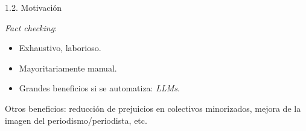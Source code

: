 \begin{frame}{1.2. Motivación}

\textit{Fact checking}:
\begin{itemize}
    \item Exhaustivo, laborioso.
    \item Mayoritariamente manual.
    \item Grandes beneficios si se automatiza: \textit{LLMs}.
\end{itemize}







\vspace{1ex}



\vspace{2ex}

Otros beneficios: reducción de prejuicios en colectivos minorizados, mejora de la imagen del periodismo/periodista, etc.

\end{frame}

